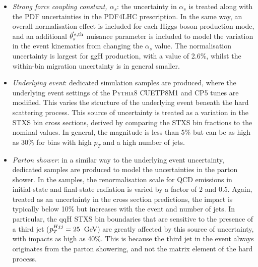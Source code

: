 \begin{itemize}
    \item \textit{Strong force coupling constant, $\alpha_s$}: the uncertainty in $\alpha_s$ is treated along with the PDF uncertainties in the PDF4LHC prescription. In the same way, an overall normalisation effect is included for each Higgs boson production mode, and an additional $\vec{\theta}^{\,\epsilon,{\rm{th}}}_{s}$ nuisance parameter is included to model the variation in the event kinematics from changing the $\alpha_s$ value. The normalisation uncertainty is largest for ggH production, with a value of 2.6\%, whilst the within-bin migration uncertainty is in general smaller.
    
    \item \textit{Underlying event}: dedicated simulation samples are produced, where the underlying event settings of the \textsc{Pythia8} CUETP8M1 and CP5 tunes are modified. This varies the structure of the underlying event beneath the hard scattering process. This source of uncertainty is treated as a variation in the STXS bin cross sections, derived by comparing the STXS bin fractions to the nominal values. In general, the magnitude is less than 5\% but can be as high as 30\% for bins with high $p_T$ and a high number of jets.
    
    \item \textit{Parton shower}: in a similar way to the underlying event uncertainty, dedicated samples are produced to model the uncertainties in the parton shower. In the samples, the renormalisation scale for QCD emissions in initial-state and final-state radiation is varied by a factor of 2 and 0.5. Again, treated as an uncertainty in the cross section predictions, the impact is typically below 10\% but increases with the event \pt and number of jets. In particular, the qqH STXS bin boundaries that are sensitive to the presence of a third jet ($p_T^{Hjj}=25$~GeV) are greatly affected by this source of uncertainty, with impacts as high as 40\%. This is because the third jet in the event always originates from the parton showering, and not the matrix element of the hard process.
    

\end{itemize}
